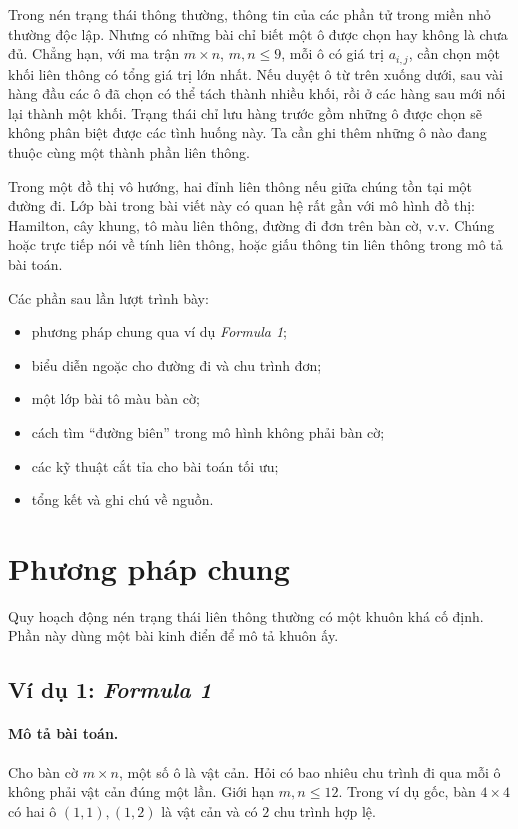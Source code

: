 \documentclass[11pt]{article}
\begin{document}
Trong nén trạng thái thông thường, thông tin của các phần tử trong miền nhỏ
thường độc lập. Nhưng có những bài chỉ biết một ô được chọn hay không là chưa
đủ. Chẳng hạn, với ma trận \(m\times n\), \(m,n\le 9\), mỗi ô có giá trị
\(a_{i,j}\), cần chọn một khối liên thông có tổng giá trị lớn nhất. Nếu duyệt
ô từ trên xuống dưới, sau vài hàng đầu các ô đã chọn có thể tách thành nhiều
khối, rồi ở các hàng sau mới nối lại thành một khối. Trạng thái chỉ lưu hàng
trước gồm những ô được chọn sẽ không phân biệt được các tình huống này. Ta cần
ghi thêm những ô nào đang thuộc cùng một thành phần liên thông.

Trong một đồ thị vô hướng, hai đỉnh liên thông nếu giữa chúng tồn tại một
đường đi. Lớp bài trong bài viết này có quan hệ rất gần với mô hình đồ thị:
Hamilton, cây khung, tô màu liên thông, đường đi đơn trên bàn cờ, v.v. Chúng
hoặc trực tiếp nói về tính liên thông, hoặc giấu thông tin liên thông trong
mô tả bài toán.

Các phần sau lần lượt trình bày:
\begin{itemize}
  \item phương pháp chung qua ví dụ \textit{Formula 1};
  \item biểu diễn ngoặc cho đường đi và chu trình đơn;
  \item một lớp bài tô màu bàn cờ;
  \item cách tìm ``đường biên'' trong mô hình không phải bàn cờ;
  \item các kỹ thuật cắt tỉa cho bài toán tối ưu;
  \item tổng kết và ghi chú về nguồn.
\end{itemize}

\section{Phương pháp chung}

Quy hoạch động nén trạng thái liên thông thường có một khuôn khá cố định. Phần
này dùng một bài kinh điển để mô tả khuôn ấy.

\subsection{Ví dụ 1: \textit{Formula 1}}

\paragraph{Mô tả bài toán.}
Cho bàn cờ \(m\times n\), một số ô là vật cản. Hỏi có bao nhiêu chu trình đi
qua mỗi ô không phải vật cản đúng một lần. Giới hạn \(m,n\le 12\). Trong ví dụ
gốc, bàn \(4\times4\) có hai ô \((1,1),(1,2)\) là vật cản và có \(2\) chu trình
hợp lệ.
\end{document}
